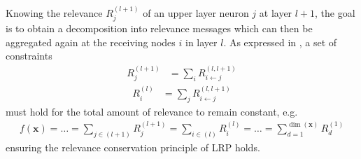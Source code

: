 \documentclass[a4wide]{article}
\newcommand{\x}{\boldsymbol{x}}
\begin{document}
Knowing the relevance $R_j^{(l+1)}$ of an upper layer neuron $j$ at layer $l+1$, the goal is to obtain a decomposition into relevance messages which can then be aggregated again at the receiving nodes $i$ in layer $l$. As expressed in \cite{bach15}, a set of constraints
\begin{align}
R_j^{(l+1)} & =  \sum\limits_{i} R_{i \leftarrow j}^{(l,l+1)}
\label{eq:c1}
\end{align}
\begin{align}
R_i^{(l)} & = \sum\limits_{j} R_{i \leftarrow j}^{(l,l+1)}
\label{eq:c2}
\end{align}
must hold for the total amount of relevance to remain constant, e.g.
\begin{align}
f(\x) = \dots = \sum\limits_{j \in (l+1)} R^{(l+1)}_j = \sum\limits_{i \in (l)} R^{(l)}_i = \dots = \sum\limits_{d=1}^{\dim(\x)} R^{(1)}_d
\label{eq:cons}
\end{align}
ensuring the relevance conservation principle of LRP holds.
\end{document}
